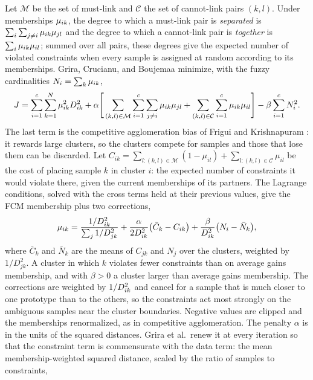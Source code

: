 Let $\mathcal{M}$ be the set of must-link and $\mathcal{C}$ the set of cannot-link pairs $(k,l)$. Under memberships $\mu_{ik}$, the degree to which a must-link pair is \emph{separated} is $\sum_i\sum_{j\ne i}\mu_{ik}\mu_{jl}$ and the degree to which a cannot-link pair is \emph{together} is $\sum_i\mu_{ik}\mu_{il}$; summed over all pairs, these degrees give the expected number of violated constraints when every sample is assigned at random according to its memberships. Grira, Crucianu, and Boujemaa \cite{grira:2006:pcca} minimize, with the fuzzy cardinalities $N_i=\sum_k\mu_{ik}$,
\begin{equation}
  J=\sum_{i=1}^{c}\sum_{k=1}^{N}\mu_{ik}^2D^2_{ik}+\alpha\Bigg[\sum_{(k,l)\in\mathcal{M}}\sum_{i=1}^{c}\sum_{j\ne i}\mu_{ik}\mu_{jl}+\sum_{(k,l)\in\mathcal{C}}\sum_{i=1}^{c}\mu_{ik}\mu_{il}\Bigg]-\beta\sum_{i=1}^{c}N_i^2 .
  \label{eq:beyond:Jpcca}
\end{equation}
The last term is the competitive agglomeration bias of Frigui and Krishnapuram \cite{frigui:1997:ca}: it rewards large clusters, so the clusters compete for samples and those that lose them can be discarded. Let $C_{ik}=\sum_{l:(k,l)\in\mathcal{M}}(1-\mu_{il})+\sum_{l:(k,l)\in\mathcal{C}}\mu_{il}$ be the cost of placing sample $k$ in cluster $i$: the expected number of constraints it would violate there, given the current memberships of its partners. The Lagrange conditions, solved with the cross terms held at their previous values, give the FCM membership plus two corrections,
\begin{equation}
  \mu_{ik}=\frac{1/D^2_{ik}}{\sum_{j}1/D^2_{jk}}+\frac{\alpha}{2D^2_{ik}}\big(\bar C_k-C_{ik}\big)+\frac{\beta}{D^2_{ik}}\big(N_i-\bar N_k\big),
  \label{eq:beyond:mupcca}
\end{equation}
where $\bar C_k$ and $\bar N_k$ are the means of $C_{jk}$ and $N_j$ over the clusters, weighted by $1/D^2_{jk}$. A cluster in which $k$ violates fewer constraints than on average gains membership, and with $\beta>0$ a cluster larger than average gains membership. The corrections are weighted by $1/D^2_{ik}$ and cancel for a sample that is much closer to one prototype than to the others, so the constraints act most strongly on the ambiguous samples near the cluster boundaries. Negative values are clipped and the memberships renormalized, as in competitive agglomeration. The penalty $\alpha$ is in the units of the squared distances. Grira et al.\ renew it at every iteration so that the constraint term is commensurate with the data term: the mean membership-weighted squared distance, scaled by the ratio of samples to constraints,
